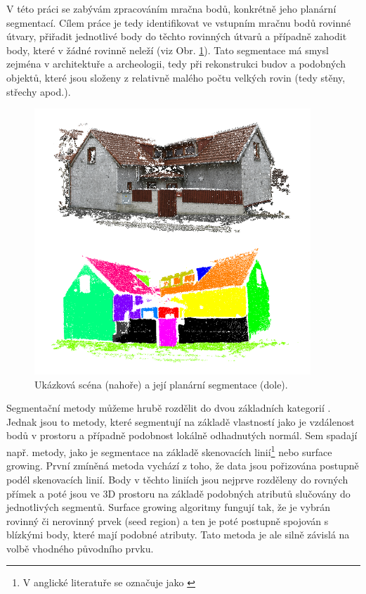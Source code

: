 \documentclass[11pt,twoside,a4paper]{book}
\begin{document}
V této práci se zabývám zpracováním mračna bodů, konkrétně jeho planární segmentací. Cílem práce je tedy
identifikovat ve vstupním mračnu bodů rovinné útvary, přiřadit jednotlivé body do těchto rovinných útvarů a
případně zahodit body, které v žádné rovinně neleží (viz Obr. \ref{fig:ukazkova-scena}). Tato segmentace
má smysl zejména v architektuře a archeologii, tedy při rekonstrukci budov a podobných objektů, které jsou
složeny z relativně malého počtu velkých rovin (tedy stěny, střechy apod.).

\begin{figure}[ht]
\begin{center}
\includegraphics[height=10cm]{figures/ukazka-segmentace}
\caption{Ukázková scéna (nahoře) a její planární segmentace (dole).}
\label{fig:ukazkova-scena}
\end{center}
\end{figure}

Segmentační metody můžeme hrubě rozdělit do dvou základních kategorií \cite{Voss04}. Jednak jsou to metody, které segmentují na základě vlastností jako je vzdálenost bodů v prostoru a případně podobnost lokálně odhadnutých normál. Sem spadají např. metody, jako je segmentace na základě skenovacích linií\footnote{V anglické literatuře se označuje jako  \cite{Voss04}} nebo surface growing. První zmíněná metoda vychází z toho, že data jsou pořizována postupně podél skenovacích linií. Body v těchto liniích jsou nejprve rozděleny do rovných přímek a poté jsou ve 3D prostoru na základě podobných atributů slučovány do jednotlivých segmentů. Surface growing algoritmy fungují tak, že je vybrán rovinný či nerovinný prvek (seed region) a ten je poté postupně spojován s blízkými body, které mají podobné atributy. Tato metoda je ale silně závislá na volbě vhodného původního prvku.
\end{document}

